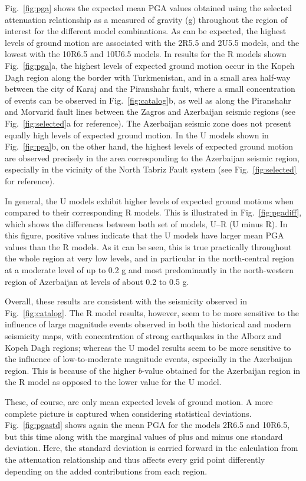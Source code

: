 Fig.~\ref{fig:pga} shows the expected mean PGA values obtained using the selected attenuation relationship as a measured of gravity (g) throughout the region of interest for the different model combinations. As can be expected, the highest levels of ground motion are associated with the 2R5.5 and 2U5.5 models, and the lowest with the 10R6.5 and 10U6.5 models. In results for the R models shown Fig.~\ref{fig:pga}a, the highest levels of expected ground motion occur in the Kopeh Dagh region along the border with Turkmenistan, and in a small area half-way between the city of Karaj and the Piranshahr fault, where a small concentration of events can be observed in Fig.~\ref{fig:catalog}b, as well as along the Piranshahr and Morvarid fault lines between the Zagros and Azerbaijan seismic regions (see Fig.~\ref{fig:selected}a for reference). The Azerbaijan seismic zone does not present equally high levels of expected ground motion. In the U models shown in Fig.~\ref{fig:pga}b, on the other hand, the highest levels of expected ground motion are observed precisely in the area corresponding to the Azerbaijan seismic region, especially in the vicinity of the North Tabriz Fault system (see Fig.~\ref{fig:selected} for reference).

In general, the U models exhibit higher levels of expected ground motions when compared to their corresponding R models. This is illustrated in Fig.~\ref{fig:pgadiff}, which shows the differences between both set of models, U--R (U minus R). In this figure, positive values indicate that the U models have larger mean PGA values than the R models. As it can be seen, this is true practically throughout the whole region at very low levels, and in particular in the north-central region at a moderate level of up to 0.2 g and most predominantly in the north-western region of Azerbaijan at levels of about 0.2 to 0.5 g.

Overall, these results are consistent with the seismicity observed in Fig.~\ref{fig:catalog}. The R model results, however, seem to be more sensitive to the influence of large magnitude events observed in both the historical and modern seismicity maps, with concentration of strong earthquakes in the Alborz and Kopeh Dagh regions; whereas the U model results seem to be more sensitive to the influence of low-to-moderate magnitude events, especially in the Azerbaijan region. This is because of the higher $b$-value obtained for the Azerbaijan region in the R model as opposed to the lower value for the U model.

These, of course, are only mean expected levels of ground motion. A more complete picture is captured when considering statistical deviations. Fig.~\ref{fig:pgastd} shows again the mean PGA for the models 2R6.5 and 10R6.5, but this time along with the marginal values of plus and minus one standard deviation. Here, the standard deviation is carried forward in the calculation from the attenuation relationship and thus affects every grid point differently depending on the added contributions from each region. 

